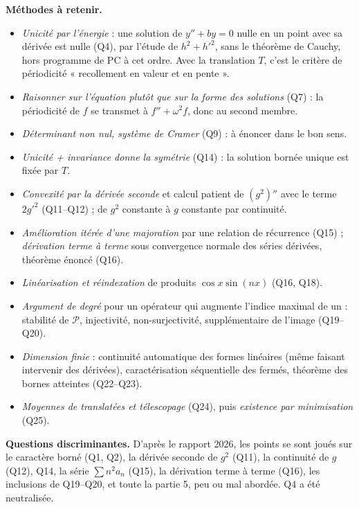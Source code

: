\documentclass[11pt,a4paper]{article}
\providecommand{\tightlist}{\setlength{\itemsep}{0pt}\setlength{\parskip}{0pt}}
\begin{document}
\textbf{Méthodes à retenir.}

\begin{itemize}
\tightlist
\item
  \emph{Unicité par l'énergie} : une solution de \(y''+by=0\) nulle en un point avec sa dérivée est nulle (Q4), par l'étude de \(h^2+h'^2\), sans le théorème de Cauchy, hors programme de PC à cet ordre. Avec la translation \(T\), c'est le critère de périodicité « recollement en valeur et en pente ».
\item
  \emph{Raisonner sur l'équation plutôt que sur la forme des solutions} (Q7) : la périodicité de \(f\) se transmet à \(f''+\omega^2f\), donc au second membre.
\item
  \emph{Déterminant non nul, système de Cramer} (Q9) : à énoncer dans le bon sens.
\item
  \emph{Unicité + invariance donne la symétrie} (Q14) : la solution bornée unique est fixée par \(T\).
\item
  \emph{Convexité par la dérivée seconde} et calcul patient de \((g^2)''\) avec le terme \(2g'^2\) (Q11--Q12) ; de \(g^2\) constante à \(g\) constante par continuité.
\item
  \emph{Amélioration itérée d'une majoration} par une relation de récurrence (Q15) ; \emph{dérivation terme à terme} sous convergence normale des séries dérivées, théorème énoncé (Q16).
\item
  \emph{Linéarisation et réindexation} de produits \(\cos x\sin(nx)\) (Q16, Q18).
\item
  \emph{Argument de degré} pour un opérateur qui augmente l'indice maximal de un : stabilité de \(\mathcal P\), injectivité, non-surjectivité, supplémentaire de l'image (Q19--Q20).
\item
  \emph{Dimension finie} : continuité automatique des formes linéaires (même faisant intervenir des dérivées), caractérisation séquentielle des fermés, théorème des bornes atteintes (Q22--Q23).
\item
  \emph{Moyennes de translatées et télescopage} (Q24), puis \emph{existence par minimisation} (Q25).
\end{itemize}

\textbf{Questions discriminantes.} D'après le rapport 2026, les points se sont joués sur le caractère borné (Q1, Q2), la dérivée seconde de \(g^2\) (Q11), la continuité de \(g\) (Q12), Q14, la série \(\sum n^2a_n\) (Q15), la dérivation terme à terme (Q16), les inclusions de Q19--Q20, et toute la partie 5, peu ou mal abordée. Q4 a été neutralisée.
\end{document}
